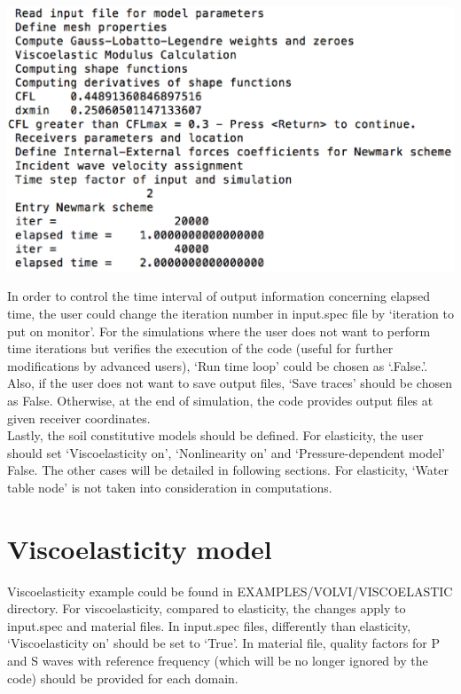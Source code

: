 \begin{center}
\leavevmode
\includegraphics [scale=0.75]{figures/terminal.eps} 
\label{ter} 
\vspace{1cm}
\end{center}


In order to control the time interval of output information concerning elapsed time, the user could change the iteration number in input.spec file by ‘iteration to put on monitor’. For the simulations where the user does not want to perform time iterations but verifies the execution of the code (useful for further modifications by advanced users), ‘Run time loop’ could be chosen as ‘.False.’. Also, if the user does not want to save output files, ‘Save traces’ should be chosen as False. Otherwise, at the end of simulation, the code provides output files at given receiver coordinates. \\

Lastly, the soil constitutive models should be defined. For elasticity, the user should set ‘Viscoelasticity on’, ‘Nonlinearity on’ and ‘Pressure-dependent model’ False. The other cases will be detailed in following sections. For elasticity, ‘Water table node’ is not taken into consideration in computations. \\



\section{Viscoelasticity model}

Viscoelasticity example could be found in EXAMPLES\slash VOLVI\slash VISCOELASTIC directory.  For viscoelasticity, compared to elasticity, the changes apply to input.spec and material files. In input.spec files, differently than elasticity, ‘Viscoelasticity on’ should be set to ‘True’. In material file, quality factors for P and S waves with reference frequency (which will be no longer ignored by the code) should be provided for each domain. 



